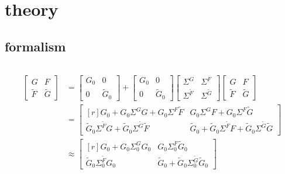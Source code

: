 
\chapter{ theory}

\section{ formalism}

\begin{equation*}
    
\end{equation*}

\begin{align*}
	\begin{bmatrix}
		G & F \\
		\widetilde F & \widetilde G
	\end{bmatrix}
	&=
	\begin{bmatrix}
		G_0 & 0 \\
		0 & \widetilde G_0
	\end{bmatrix}
	+
	\begin{bmatrix}
		G_0 & 0 \\
		0 & \widetilde G_0
	\end{bmatrix}
	\begin{bmatrix}
		\Sigma^G & \Sigma^F \\
		\Sigma^{\widetilde F} & \Sigma^{\widetilde G}
	\end{bmatrix}
	\begin{bmatrix}
		G & F \\
		\widetilde F & \widetilde G
	\end{bmatrix}
	\\
	&=
	\begin{bmatrix*}[r]
		G_0 + G_0 \Sigma^G G + G_0 \Sigma^F \widetilde F
        & G_0 \Sigma^G F + G_0 \Sigma^F \widetilde G \\
		\widetilde G_0 \Sigma^{\widetilde F} G
        + \widetilde G_0 \Sigma^{\widetilde G} \widetilde F
        & \widetilde G_0 + \widetilde G_0 \Sigma^{\widetilde F} F
        + \widetilde G_0 \Sigma^{\widetilde G} \widetilde G
	\end{bmatrix*}
	\\
	&\approx
	\begin{bmatrix*}[r]
		G_0 + G_0 \Sigma^G_0 G_0 & G_0 \Sigma^F_0 \widetilde G_0 \\
		\widetilde G_0 \Sigma^{\widetilde F}_0 G_0 & \widetilde G_0
        + \widetilde G_0 \Sigma^{\widetilde G}_0 \widetilde G_0
	\end{bmatrix*}
\end{align*}

